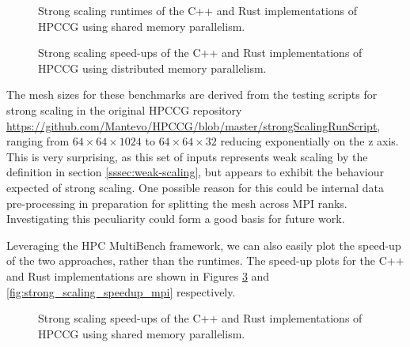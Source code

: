 \begin{figure}[H]
    \centering
    \fbox{}
    \captionsetup{skip=0pt}
    \caption{Strong scaling runtimes of the C++ and Rust implementations of \acrshort{HPCCG} using shared memory parallelism.}
    \label{fig:strong_scaling_threaded}
\end{figure}

\begin{figure}[H]
    \centering
    \fbox{}
    \captionsetup{skip=0pt}
    \caption{Strong scaling speed-ups of the C++ and Rust implementations of \acrshort{HPCCG} using distributed memory parallelism.}
    \label{fig:strong_scaling_mpi}
\end{figure}

The mesh sizes for these benchmarks are derived from the testing scripts for strong scaling in the original \acrshort{HPCCG} repository \url{https://github.com/Mantevo/HPCCG/blob/master/strongScalingRunScript}, ranging from $64 \times 64 \times 1024$ to $64 \times 64 \times 32$ reducing exponentially on the z axis. This is very surprising, as this set of inputs represents weak scaling by the definition in section \ref{sssec:weak-scaling}, but appears to exhibit the behaviour expected of strong scaling. One possible reason for this could be internal data pre-processing in preparation for splitting the mesh across MPI ranks. Investigating this peculiarity could form a good basis for future work.

Leveraging the HPC MultiBench framework, we can also easily plot the speed-up of the two approaches, rather than the runtimes. The speed-up plots for the C++ and Rust implementations are shown in Figures \ref{fig:strong_scaling_speedup_threaded} and \ref{fig:strong_scaling_speedup_mpi} respectively.

\begin{figure}[H]
    \centering
    \fbox{}
    \captionsetup{skip=0pt}
    \caption{Strong scaling speed-ups of the C++ and Rust implementations of \acrshort{HPCCG} using shared memory parallelism.}
    \label{fig:strong_scaling_speedup_threaded}
\end{figure}

